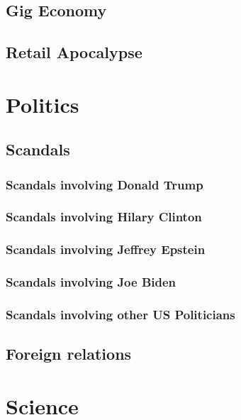 		\subsection{Gig Economy}
		\subsection{Retail Apocalypse}
		
		
	\section{Politics}
		\subsection{Scandals}
			\subsubsection{Scandals involving Donald Trump}
			\subsubsection{Scandals involving Hilary Clinton}
			\subsubsection{Scandals involving Jeffrey Epstein}
			\subsubsection{Scandals involving Joe Biden}
			\subsubsection{Scandals involving other US Politicians}

		\subsection{Foreign relations}	
	\section{Science}